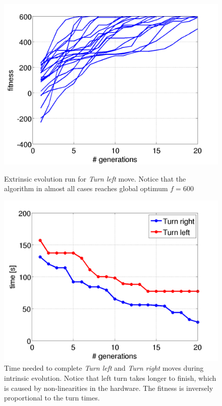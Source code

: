 \begin{figure}
\centering
{}
\includegraphics[width=\textwidth]{Files/Figures/extrinsic.png}
\caption[Extrinsic evolution run for \textit{Turn left} move]{Extrinsic evolution run for \textit{Turn left} move. Notice that the algorithm in almost all cases reaches global optimum $f=600$ \newline \newline}
\label{fig-extrinsic}
\endminipage\hfill
{}
\centering
\includegraphics[width=\textwidth]{Files/Figures/intrinsic.png}
\caption[Intrinsic evolution run for \textit{Turn left} and \textit{Turn right} moves]{Time needed to complete \textit{Turn left} and \textit{Turn right} moves during intrinsic evolution. Notice that left turn takes longer to finish, which is caused by non-linearities in the hardware. The fitness is inversely proportional to the turn times.}
\label{fig-intrinsic}
\endminipage\hfill
\end{figure}


